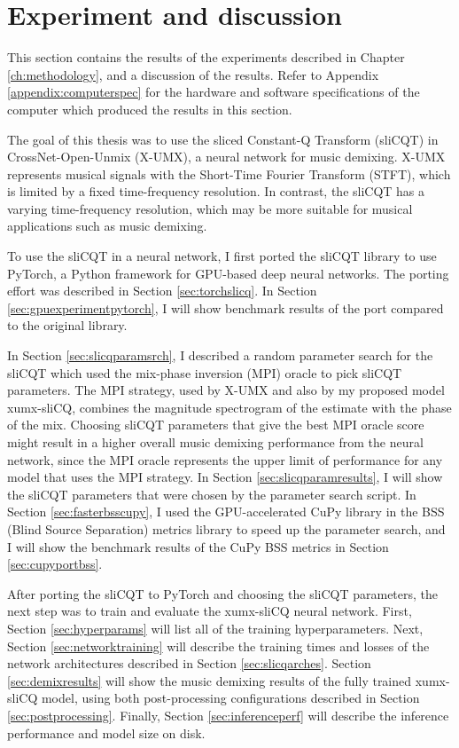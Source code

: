 \documentclass[report.tex]{subfiles}
\begin{document}
\section{Experiment and discussion}
\label{ch:experiment}

This section contains the results of the experiments described in Chapter \ref{ch:methodology}, and a discussion of the results. Refer to Appendix \ref{appendix:computerspec} for the hardware and software specifications of the computer which produced the results in this section.

The goal of this thesis was to use the sliced Constant-Q Transform (sliCQT) in CrossNet-Open-Unmix (X-UMX), a neural network for music demixing. X-UMX represents musical signals with the Short-Time Fourier Transform (STFT), which is limited by a fixed time-frequency resolution. In contrast, the sliCQT has a varying time-frequency resolution, which may be more suitable for musical applications such as music demixing.

To use the sliCQT in a neural network, I first ported the sliCQT library to use PyTorch, a Python framework for GPU-based deep neural networks. The porting effort was described in Section \ref{sec:torchslicq}. In Section \ref{sec:gpuexperimentpytorch}, I will show benchmark results of the port compared to the original library.

In Section \ref{sec:slicqparamsrch}, I described a random parameter search for the sliCQT which used the mix-phase inversion (MPI) oracle to pick sliCQT parameters. The MPI strategy, used by X-UMX and also by my proposed model xumx-sliCQ, combines the magnitude spectrogram of the estimate with the phase of the mix. Choosing sliCQT parameters that give the best MPI oracle score might result in a higher overall music demixing performance from the neural network, since the MPI oracle represents the upper limit of performance for any model that uses the MPI strategy. In Section \ref{sec:slicqparamresults}, I will show the sliCQT parameters that were chosen by the parameter search script. In Section \ref{sec:fasterbsscupy}, I used the GPU-accelerated CuPy library in the BSS (Blind Source Separation) metrics library to speed up the parameter search, and I will show the benchmark results of the CuPy BSS metrics in Section \ref{sec:cupyportbss}.

After porting the sliCQT to PyTorch and choosing the sliCQT parameters, the next step was to train and evaluate the xumx-sliCQ neural network. First, Section \ref{sec:hyperparams} will list all of the training hyperparameters. Next, Section \ref{sec:networktraining} will describe the training times and losses of the network architectures described in Section \ref{sec:slicqarches}. Section \ref{sec:demixresults} will show the music demixing results of the fully trained xumx-sliCQ model, using both post-processing configurations described in Section \ref{sec:postprocessing}. Finally, Section \ref{sec:inferenceperf} will describe the inference performance and model size on disk.
\end{document}
